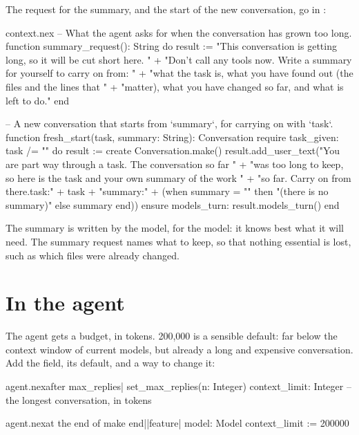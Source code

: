 The request for the summary, and the start of the new conversation, go in
:

\begin{append}{context.nex}
-- What the agent asks for when the conversation has grown too long.
function summary_request(): String do
  result := "This conversation is getting long, so it will be cut short here. "
    + "Don't call any tools now. Write a summary for yourself to carry on from: "
    + "what the task is, what you have found out (the files and the lines that "
    + "matter), what you have changed so far, and what is left to do."
end

-- A new conversation that starts from `summary`, for carrying on with `task`.
function fresh_start(task, summary: String): Conversation
require
  task_given: task /= ""
do
  result := create Conversation.make()
  result.add_user_text("You are part way through a task. The conversation so far "
    + "was too long to keep, so here is the task and your own summary of the work "
    + "so far. Carry on from there.\n\nThe task:\n" + task
    + "\n\nYour summary:\n" + (when summary = "" then "(there is no summary)" else summary end))
ensure
  models_turn: result.models_turn()
end
\end{append}

The summary is written by the model, for the model: it knows best what it
will need. The summary request names what to keep, so that nothing
essential is lost, such as which files were already changed.

\section{In the agent}

The agent gets a budget, in tokens. 200,000 is a sensible default: far
below the context window of current models, but already a long and
expensive conversation. Add the field, its default, and a way to change it:

\begin{tightaddbefore}{agent.nex}{after max_replies}{|  set_max_replies(n: Integer)}
  context_limit: Integer       -- the longest conversation, in tokens
\end{tightaddbefore}

\begin{tightaddbefore}{agent.nex}{at the end of make}{  end||feature|  model: Model}
    context_limit := 200000
\end{tightaddbefore}

